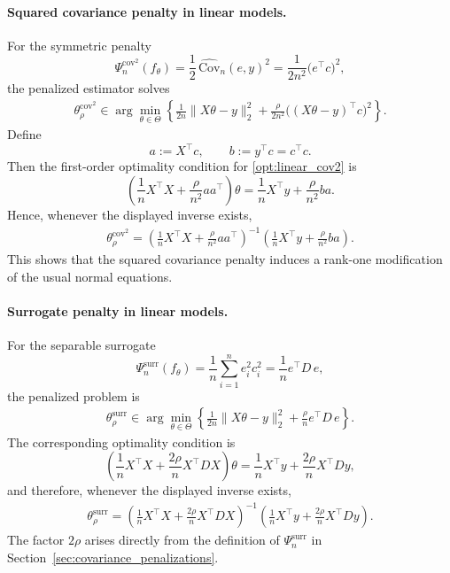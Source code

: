 \documentclass[12pt, draft]{article}
\theoremstyle{plain}
\theoremstyle{definition}
\newcommand{\1}{\mathbf{1}}
\newcommand{\Cov}{\text{Cov}}
\begin{document}
{\paragraph{Squared covariance penalty in linear models.}
For the symmetric penalty
\[
\Psi_n^{\mathrm{cov}^2}(f_\theta)
=
\frac{1}{2}\,\widehat{\Cov}_n(e,y)^2
=
\frac{1}{2n^2}\bigl(e^\top c\bigr)^2,
\]
the penalized estimator solves
\begin{align}
    \label{opt:linear_cov2}
    \theta_{\rho}^{\mathrm{cov}^2}
    \in
    \arg\min_{\theta\in\Theta}
    \left\{
        \frac{1}{2n}\|X\theta-y\|_2^2
        +
        \frac{\rho}{2n^2}\bigl((X\theta-y)^\top c\bigr)^2
    \right\}.
\end{align}
Define
\[
a := X^\top c,
\qquad
b := y^\top c = c^\top c.
\]
Then the first-order optimality condition for \eqref{opt:linear_cov2} is
\[
\left(
\frac{1}{n}X^\top X + \frac{\rho}{n^2}aa^\top
\right)\theta
=
\frac{1}{n}X^\top y + \frac{\rho}{n^2}ba.
\]
Hence, whenever the displayed inverse exists,
\begin{align}
    \label{eq:linear_cov2_closed_form}
    \theta_{\rho}^{\mathrm{cov}^2}
    =
    \left(
        \frac{1}{n}X^\top X
        +
        \frac{\rho}{n^2}aa^\top
    \right)^{-1}
    \left(
        \frac{1}{n}X^\top y
        +
        \frac{\rho}{n^2}ba
    \right).
\end{align}
This shows that the squared covariance penalty induces a rank-one modification of the usual normal equations.

\paragraph{Surrogate penalty in linear models.}
For the separable surrogate
\[
\Psi_n^{\mathrm{surr}}(f_\theta)
=
\frac{1}{n}\sum_{i=1}^n e_i^2 c_i^2
=
\frac{1}{n}e^\top D\,e,
\]
the penalized problem is
\begin{align}
    \label{opt:linear_surr}
    \theta_{\rho}^{\mathrm{surr}}
    \in
    \arg\min_{\theta\in\Theta}
    \left\{
        \frac{1}{2n}\|X\theta-y\|_2^2
        +
        \frac{\rho}{n}e^\top D\,e
    \right\}.
\end{align}
The corresponding optimality condition is
\[
\left(
\frac{1}{n}X^\top X
+
\frac{2\rho}{n}X^\top D X
\right)\theta
=
\frac{1}{n}X^\top y
+
\frac{2\rho}{n}X^\top D y,
\]
and therefore, whenever the displayed inverse exists,
\begin{align}
    \label{eq:linear_surr_closed_form}
    \theta_{\rho}^{\mathrm{surr}}
    =
    \left(
        \frac{1}{n}X^\top X
        +
        \frac{2\rho}{n}X^\top D X
    \right)^{-1}
    \left(
        \frac{1}{n}X^\top y
        +
        \frac{2\rho}{n}X^\top D y
    \right).
\end{align}
The factor \(2\rho\) arises directly from the definition of \(\Psi_n^{\mathrm{surr}}\) in Section~\ref{sec:covariance_penalizations}.

}
\end{document}
